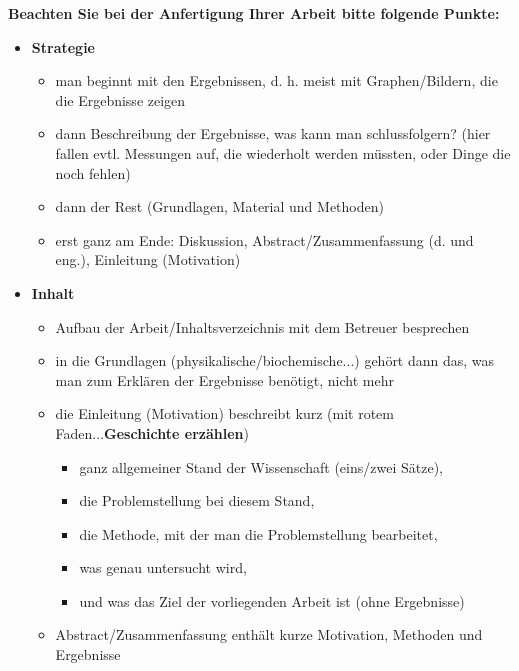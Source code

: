 \textbf{Beachten Sie bei der Anfertigung Ihrer Arbeit bitte folgende Punkte:}\vspace{0.5cm}
\begin{itemize}
\item \textbf{Strategie}\begin{itemize}
	\item man beginnt mit den Ergebnissen, d. h. meist mit Graphen/Bildern, die die Ergebnisse zeigen
	\item dann Beschreibung der Ergebnisse, was kann man schlussfolgern? (hier fallen evtl. Messungen auf, die wiederholt werden müssten, oder Dinge die noch fehlen)
	\item dann der Rest (Grundlagen, Material und Methoden)
	\item erst ganz am Ende: Diskussion, Abstract/Zusammenfassung (d. und eng.), Einleitung (Motivation)
\end{itemize}
\item \textbf{Inhalt}\begin{itemize}

\item Aufbau der Arbeit/Inhaltsverzeichnis mit dem Betreuer besprechen
\item in die Grundlagen (physikalische/biochemische...) gehört dann das, was man zum Erklären der Ergebnisse benötigt, nicht mehr
\item die Einleitung (Motivation) beschreibt kurz (mit rotem Faden...\textbf{Geschichte erzählen})
\begin{itemize}
\item ganz allgemeiner Stand der Wissenschaft (eins/zwei Sätze),
\item	die Problemstellung bei diesem Stand,
\item	die Methode, mit der man die Problemstellung bearbeitet,
\item	was genau untersucht wird, 
\item	und was das Ziel der vorliegenden Arbeit ist (ohne Ergebnisse)
\end{itemize} 
\item Abstract/Zusammenfassung enthält kurze Motivation, Methoden und Ergebnisse
\end{itemize}


\end{itemize}
